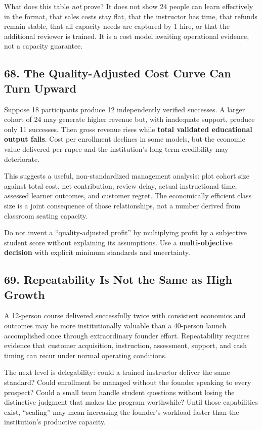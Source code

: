 What does this table \emph{not} prove? It does not show 24 people can learn effectively in the format, that sales costs stay flat, that the instructor has time, that refunds remain stable, that all capacity needs are captured by 1 hire, or that the additional reviewer is trained. It is a cost model awaiting operational evidence, not a capacity guarantee.

\subsection*{68. The Quality-Adjusted Cost Curve Can Turn Upward}

Suppose 18 participants produce 12 independently verified successes. A larger cohort of 24 may generate higher revenue but, with inadequate support, produce only 11 successes. Then gross revenue rises while \textbf{total validated educational output falls}. Cost per enrollment declines in some models, but the economic value delivered per rupee and the institution's long-term credibility may deteriorate.

This suggests a useful, non-standardized management analysis: plot cohort size against total cost, net contribution, review delay, actual instructional time, assessed learner outcomes, and customer regret. The economically efficient class size is a joint consequence of those relationships, not a number derived from classroom seating capacity.

Do not invent a ``quality-adjusted profit'' by multiplying profit by a subjective student score without explaining its assumptions. Use a \textbf{multi-objective decision} with explicit minimum standards and uncertainty.

\subsection*{69. Repeatability Is Not the Same as High Growth}

A 12-person course delivered successfully twice with consistent economics and outcomes may be more institutionally valuable than a 40-person launch accomplished once through extraordinary founder effort. Repeatability requires evidence that customer acquisition, instruction, assessment, support, and cash timing can recur under normal operating conditions.

The next level is delegability: could a trained instructor deliver the same standard? Could enrollment be managed without the founder speaking to every prospect? Could a small team handle student questions without losing the distinctive judgment that makes the program worthwhile? Until those capabilities exist, ``scaling'' may mean increasing the founder's workload faster than the institution's productive capacity.
